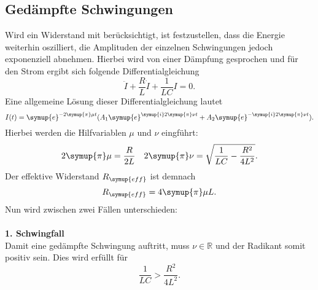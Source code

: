 \subsection{Gedämpfte Schwingungen}
Wird ein Widerstand mit berücksichtigt, ist festzustellen, dass die Energie weiterhin oszilliert, die Amplituden der einzelnen 
Schwingungen jedoch exponenziell abnehmen. Hierbei wird von einer Dämpfung gesprochen und für den Strom ergibt sich folgende 
Differentialgleichung
\begin{equation*}
    \ddot{I}+\frac{R}{L}\dot{I}+\frac{1}{LC}I=0.
\end{equation*}
Eine allgemeine Lösung dieser Differentialgleichung lautet
\begin{equation}
    I(t) = \symup{e}^{-2\symup{\pi}\mu t} (A_{1}\symup{e}^{\symup{i}2\symup{\pi}\nu t} + A_{2}\symup{e}^{-\symup{i}2\symup{\pi}\nu t}).
    \label{eq:DGL fuer I komplex}
\end{equation}
Hierbei werden die Hilfvariablen $\mu$ und $\nu$ eingführt:
\begin{align*}
    2\symup{\pi}\mu &= \frac{R}{2L} & 2\symup{\pi}\nu = \sqrt{\frac{1}{LC}-\frac{R^{2}}{4L^{2}}}.
\end{align*}
Der effektive Widerstand $R_{\symup{eff}}$ ist demnach
\begin{equation}
    R_{\symup{eff}} = 4\symup{\pi}\mu L.
    \label{eq:effektiver Widerstand}
\end{equation}
Nun wird zwischen zwei Fällen unterschieden:
\\
\\
\textbf{1. Schwingfall} \\
Damit eine gedämpfte Schwingung auftritt, muss $\nu \in \mathbb{R}$ und der Radikant somit positiv sein. Dies wird erfüllt für
\begin{equation*}
    \frac{1}{LC} > \frac{R^{2}}{4L^{2}}.
\end{equation*}

